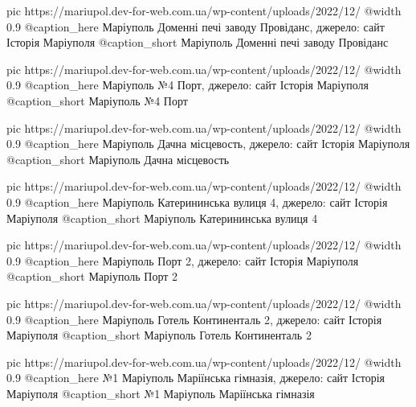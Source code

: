   pic https://mariupol.dev-for-web.com.ua/wp-content/uploads/2022/12/%
  @width 0.9
  @caption_here Маріуполь Доменні печі заводу Провіданс, джерело: сайт Історія Маріуполя
  @caption_short Маріуполь Доменні печі заводу Провіданс

  pic https://mariupol.dev-for-web.com.ua/wp-content/uploads/2022/12/%
  @width 0.9
  @caption_here Маріуполь №4 Порт, джерело: сайт Історія Маріуполя
  @caption_short Маріуполь №4 Порт

  pic https://mariupol.dev-for-web.com.ua/wp-content/uploads/2022/12/%
  @width 0.9
  @caption_here Маріуполь Дачна місцевость, джерело: сайт Історія Маріуполя
  @caption_short Маріуполь Дачна місцевость

  pic https://mariupol.dev-for-web.com.ua/wp-content/uploads/2022/12/%
  @width 0.9
  @caption_here Маріуполь Катерининська вулиця 4, джерело: сайт Історія Маріуполя
  @caption_short Маріуполь Катерининська вулиця 4

  pic https://mariupol.dev-for-web.com.ua/wp-content/uploads/2022/12/%
  @width 0.9
  @caption_here Маріуполь Порт 2, джерело: сайт Історія Маріуполя
  @caption_short Маріуполь Порт 2

  pic https://mariupol.dev-for-web.com.ua/wp-content/uploads/2022/12/%
  @width 0.9
  @caption_here Маріуполь Готель Континенталь 2, джерело: сайт Історія Маріуполя
  @caption_short Маріуполь Готель Континенталь 2

  pic https://mariupol.dev-for-web.com.ua/wp-content/uploads/2022/12/%
  @width 0.9
  @caption_here №1 Маріуполь Маріїнська гімназія, джерело: сайт Історія Маріуполя
  @caption_short №1 Маріуполь Маріїнська гімназія

